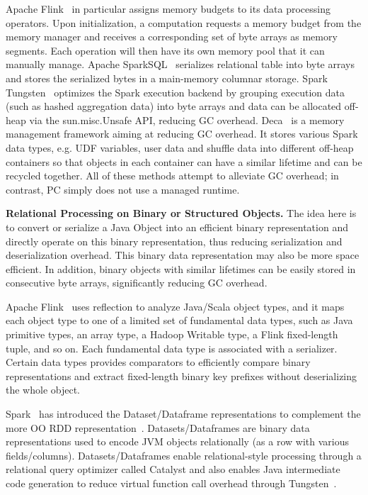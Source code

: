 Apache Flink~\cite{alexandrov2014stratosphere} in particular
assigns memory budgets to its data processing operators. Upon
initialization, a computation requests a memory budget from the
memory manager and receives a corresponding set of byte arrays as memory segments. 
Each operation will then have its own memory pool that it can manually
manage. 
Apache SparkSQL~\cite{armbrust2015spark} serializes 
relational table into byte arrays and stores the serialized bytes
in a main-memory columnar storage. Spark Tungsten~\cite{tungsten}
optimizes the Spark execution backend by grouping execution
data (such as hashed aggregation data) 
into byte arrays and data can be allocated off-heap via
the sun.misc.Unsafe API, reducing
GC overhead. Deca~\cite{lu2016lifetime} is a memory management framework aiming at
reducing GC overhead. It stores
various Spark data types, e.g. UDF variables, user data and
shuffle data into different
off-heap containers so that objects in each container can have a similar
lifetime and can be recycled together.
All of these methods attempt to alleviate GC overhead; in contrast, PC simply does
not use a managed runtime.

\vspace{5pt}
\noindent
\textbf{Relational Processing on Binary or Structured Objects.} The idea here is to convert or
serialize a Java Object into an efficient binary representation and directly
operate on this binary representation, thus reducing serialization and
deserialization overhead.  This 
binary data representation may also be more space efficient. In addition, binary objects
with similar lifetimes can be easily stored in consecutive byte
arrays, significantly reducing GC overhead.

Apache Flink~\cite{alexandrov2014stratosphere} uses reflection
to analyze Java/Scala object types, and it
maps each object type to one of a limited set of
fundamental data types, such as Java primitive types, an array type,
a Hadoop Writable type, a Flink fixed-length tuple, and so on. Each
fundamental data type is associated with a serializer.  Certain data
types provides comparators to efficiently compare binary
representations and extract fixed-length binary key prefixes without
deserializing the whole object.

Spark~\cite{tungsten} has introduced the Dataset/Dataframe representations
to complement the more OO 
RDD representation~\cite{zaharia2012resilient}. Datasets/Dataframes are
binary data representations used to encode JVM objects relationally (as a
row with various fields/columns). 
Datasets/Dataframes enable relational-style processing
through a relational query optimizer called Catalyst and
also enables Java intermediate code generation to reduce virtual
function call overhead through Tungsten~\cite{tungsten}. 

